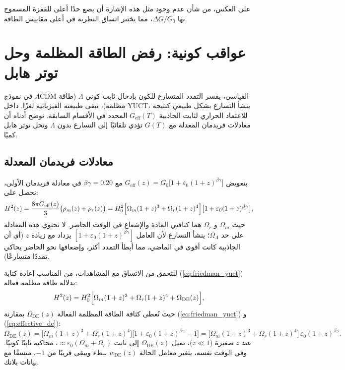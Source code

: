 \documentclass[11pt,a4paper]{article}
\begin{document}
	على العكس، من شأن عدم وجود مثل هذه الإشارة أن يضع حدًا أعلى للقفزة المسموح بها $\Delta G/G_0$، مما يختبر اتساق النظرية في أعلى مقاييس الطاقة.
	
	\section{عواقب كونية: رفض الطاقة المظلمة وحل توتر هابل}
	\label{sec:cosmo-consequences}
	
	في نموذج $\Lambda$CDM القياسي، يفسر التمدد المتسارع للكون بإدخال ثابت كوني $\Lambda$ (طاقة مظلمة)، تبقى طبيعته الفيزيائية لغزًا. داخل YUCT، ينشأ التسارع بشكل طبيعي كنتيجة للاعتماد الحراري لثابت الجاذبية $G_{\mathrm{eff}}(T)$ المحدد في الأقسام السابقة. نوضح أدناه أن معادلات فريدمان المعدلة مع $G(T)$ تؤدي تلقائيًا إلى التسارع بدون $\Lambda$ وتحل توتر هابل كميًا.
	
	\subsection{معادلات فريدمان المعدلة}
	
	بتعويض $G_{\mathrm{eff}}(z) = G_0\bigl[1 + \varepsilon_0 (1+z)^{\beta\gamma}\bigr]$ مع $\beta\gamma = 0.20$ في معادلة فريدمان الأولى، نحصل على:
	\begin{equation}
		H^2(z) = \frac{8\pi G_{\mathrm{eff}}(z)}{3} \bigl(\rho_m(z) + \rho_r(z)\bigr) = H_0^2\Bigl[\Omega_m (1+z)^3 + \Omega_r (1+z)^4\Bigr]\bigl[1 + \varepsilon_0 (1+z)^{\beta\gamma}\bigr],
		\label{eq:friedman_yuct}
	\end{equation}
	حيث $\Omega_m$ و $\Omega_r$ هما كثافتي المادة والإشعاع في الوقت الحاضر. لا تحتوي هذه المعادلة على حد $\Omega_\Lambda$؛ ينشأ التسارع لأن العامل $[1 + \varepsilon_0 (1+z)^{\beta\gamma}]$ يزداد مع زيادة $z$ (أي أن الجاذبية كانت أقوى في الماضي، مما أبطأ التمدد أكثر، وإضعافها نحو الحاضر يحاكي تمددًا متسارعًا).
	
	للتحقق من الاتساق مع المشاهدات، من المناسب إعادة كتابة (\ref{eq:friedman_yuct}) بدلالة طاقة مظلمة فعالة:
	\begin{equation}
		H^2(z) = H_0^2\Bigl[\Omega_m (1+z)^3 + \Omega_r (1+z)^4 + \Omega_{\mathrm{DE}}(z)\Bigr],
		\label{eq:effective_de}
	\end{equation}
	حيث تُعطى كثافة الطاقة المظلمة الفعالة $\Omega_{\mathrm{DE}}(z)$ بمقارنة (\ref{eq:friedman_yuct}) و (\ref{eq:effective_de}):
	\begin{equation}
		\Omega_{\mathrm{DE}}(z) = \bigl[\Omega_m (1+z)^3 + \Omega_r (1+z)^4\bigr]\bigl[1 + \varepsilon_0 (1+z)^{\beta\gamma} - 1\bigr] = \bigl[\Omega_m (1+z)^3 + \Omega_r (1+z)^4\bigr]\,\varepsilon_0 (1+z)^{\beta\gamma}.
		\label{eq:de_yuct}
	\end{equation}
	عند $z$ صغيرة ($z \ll 1$)، تميل $\Omega_{\mathrm{DE}}(z)$ إلى ثابت $\approx \varepsilon_0 (\Omega_m + \Omega_r)$، محاكية ثابتًا كونيًا. وفي الوقت نفسه، يتغير معامل الحالة $w_{\mathrm{DE}}(z)$ ببطء ويبقى قريبًا من $-1$، متسقًا مع بيانات بلانك.
	
\end{document}
